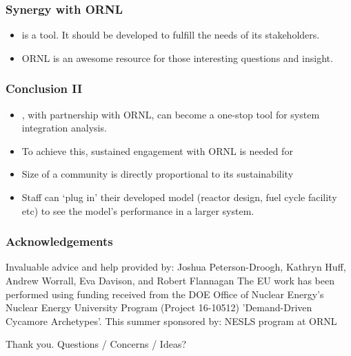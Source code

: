 \begin{frame}
	\frametitle{Synergy with ORNL}
	\begin{itemize}
		\item \Cyclus is a tool. It should be developed to fulfill the needs of its stakeholders.
		\item ORNL is an awesome resource for those interesting questions and insight.
	\end{itemize}
\end{frame}


\begin{frame}
	\frametitle{Conclusion II}
	\begin{itemize}
		\item \Cyclus, with partnership with ORNL, can become a one-stop tool for system integration analysis.
        \item To achieve this, sustained engagement with ORNL is needed for \Cyclus
        \item Size of a community is directly proportional to its sustainability
		\item Staff can `plug in' their developed model (reactor design, fuel cycle facility etc) to see the model's performance in a larger system.
	\end{itemize}
\end{frame}




\begin{frame}
    \frametitle{Acknowledgements}
    Invaluable advice and help provided by:
    Joshua Peterson-Droogh, Kathryn Huff, Andrew Worrall, Eva Davison, and Robert Flannagan
    \hfill \break
    \hfill \break
    The EU work has been performed using funding received from the DOE Office of Nuclear Energy's Nuclear Energy University Program (Project 16-10512) 'Demand-Driven Cycamore Archetypes'.
    \hfill \break
    \hfill \break
    This summer sponsored by:
    NESLS program at ORNL

\end{frame}

\begin{frame}
    Thank you. Questions / Concerns / Ideas?
\end{frame}


